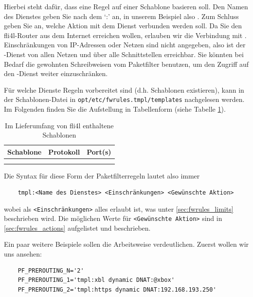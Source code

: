 Hierbei steht  dafür, dass eine Regel auf einer Schablone
basieren soll. Den Namen des Dienstes geben Sie nach dem `:'
an, in unserem Beispiel also . Zum Schluss geben Sie an, welche
Aktion mit dem Dienst verbunden werden soll. Da Sie den fli4l-Router
aus dem Internet erreichen wollen, erlauben wir die Verbindung mit
. Einschränkungen von IP-Adressen oder Netzen sind nicht
angegeben, also ist der -Dienst von allen Netzen und über alle
Schnittstellen erreichbar. Sie könnten bei Bedarf die gewohnten Schreibweisen
vom Paketfilter benutzen, um den Zugriff auf den -Dienst weiter
einzuschränken.

Für welche Dienste Regeln vorbereitet sind (d.h. Schablonen existieren),
kann in der Schablonen-Datei in \verb+opt/etc/fwrules.tmpl/templates+
nachgelesen werden. Im Folgenden finden Sie die Aufstellung in Tabellenform
(siehe Tabelle \ref{tab:fwrules_tmpl}).

\begin{center}
  {\footnotesize
  \begin{longtable}{|lll|}
     \hline
     {\textbf{Schablone}} & {\textbf{Protokoll}} & {\textbf{Port(s)}} \\
     \hline\hline
     \endhead
      \\
     \caption{Im Lieferumfang von fli4l enthaltene Schablonen}
     \label{tab:fwrules_tmpl}
  \end{longtable}}
\end{center}

Die Syntax für diese Form der Paketfilterregeln lautet also immer

\begin{example}
\begin{verbatim}
    tmpl:<Name des Dienstes> <Einschränkungen> <Gewünschte Aktion>
\end{verbatim}
\end{example}

wobei als \verb+<Einschränkungen>+ alles erlaubt ist, was unter
\ref{sec:fwrules_limits} beschrieben wird. Die möglichen Werte für
\verb+<Gewünschte Aktion>+ sind in \ref{sec:fwrules_actions} aufgelistet und
beschrieben.

Ein paar weitere Beispiele sollen die Arbeitsweise verdeutlichen. Zuerst
wollen wir uns  ansehen:

\begin{example}
\begin{verbatim}
    PF_PREROUTING_N='2'
    PF_PREROUTING_1='tmpl:xbl dynamic DNAT:@xbox'
    PF_PREROUTING_2='tmpl:https dynamic DNAT:192.168.193.250'
\end{verbatim}
\end{example}

